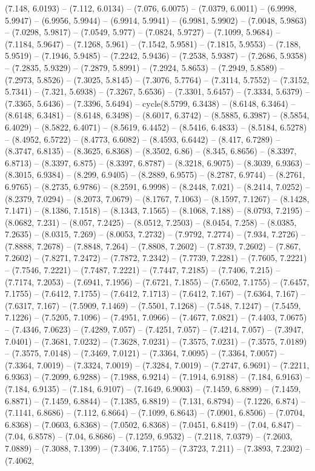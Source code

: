 (7.148, 6.0193) -- (7.112, 6.0134) -- (7.076, 6.0075) -- (7.0379, 6.0011) -- (6.9998, 5.9947) -- (6.9956, 5.9944) -- (6.9914, 5.9941) -- (6.9981, 5.9902) -- (7.0048, 5.9863) -- (7.0298, 5.9817) -- (7.0549, 5.977) -- (7.0824, 5.9727) -- (7.1099, 5.9684) -- (7.1184, 5.9647) -- (7.1268, 5.961) -- (7.1542, 5.9581) -- (7.1815, 5.9553) -- (7.188, 5.9519) -- (7.1946, 5.9485) -- (7.2242, 5.9436) -- (7.2538, 5.9387) -- (7.2686, 5.9358) -- (7.2835, 5.9329) -- (7.2879, 5.8991) -- (7.2924, 5.8653) -- (7.2949, 5.8589) -- (7.2973, 5.8526) -- (7.3025, 5.8145) -- (7.3076, 5.7764) -- (7.3114, 5.7552) -- (7.3152, 5.7341) -- (7.321, 5.6938) -- (7.3267, 5.6536) -- (7.3301, 5.6457) -- (7.3334, 5.6379) -- (7.3365, 5.6436) -- (7.3396, 5.6494) -- cycle(8.5799, 6.3438) -- (8.6148, 6.3464) -- (8.6148, 6.3481) -- (8.6148, 6.3498) -- (8.6017, 6.3742) -- (8.5885, 6.3987) -- (8.5854, 6.4029) -- (8.5822, 6.4071) -- (8.5619, 6.4452) -- (8.5416, 6.4833) -- (8.5184, 6.5278) -- (8.4952, 6.5722) -- (8.4773, 6.6082) -- (8.4593, 6.6442) -- (8.417, 6.7289) -- (8.3747, 6.8135) -- (8.3625, 6.8368) -- (8.3502, 6.86) -- (8.345, 6.8656) -- (8.3397, 6.8713) -- (8.3397, 6.875) -- (8.3397, 6.8787) -- (8.3218, 6.9075) -- (8.3039, 6.9363) -- (8.3015, 6.9384) -- (8.299, 6.9405) -- (8.2889, 6.9575) -- (8.2787, 6.9744) -- (8.2761, 6.9765) -- (8.2735, 6.9786) -- (8.2591, 6.9998) -- (8.2448, 7.021) -- (8.2414, 7.0252) -- (8.2379, 7.0294) -- (8.2073, 7.0679) -- (8.1767, 7.1063) -- (8.1597, 7.1267) -- (8.1428, 7.1471) -- (8.1386, 7.1518) -- (8.1343, 7.1565) -- (8.1068, 7.188) -- (8.0793, 7.2195) -- (8.0682, 7.231) -- (8.057, 7.2425) -- (8.0512, 7.2503) -- (8.0454, 7.258) -- (8.0385, 7.2635) -- (8.0315, 7.269) -- (8.0053, 7.2732) -- (7.9792, 7.2774) -- (7.934, 7.2726) -- (7.8888, 7.2678) -- (7.8848, 7.264) -- (7.8808, 7.2602) -- (7.8739, 7.2602) -- (7.867, 7.2602) -- (7.8271, 7.2472) -- (7.7872, 7.2342) -- (7.7739, 7.2281) -- (7.7605, 7.2221) -- (7.7546, 7.2221) -- (7.7487, 7.2221) -- (7.7447, 7.2185) -- (7.7406, 7.215) -- (7.7174, 7.2053) -- (7.6941, 7.1956) -- (7.6721, 7.1855) -- (7.6502, 7.1755) -- (7.6457, 7.1755) -- (7.6412, 7.1755) -- (7.6412, 7.1713) -- (7.6412, 7.167) -- (7.6364, 7.167) -- (7.6317, 7.167) -- (7.5909, 7.1469) -- (7.5501, 7.1268) -- (7.548, 7.1247) -- (7.5459, 7.1226) -- (7.5205, 7.1096) -- (7.4951, 7.0966) -- (7.4677, 7.0821) -- (7.4403, 7.0675) -- (7.4346, 7.0623) -- (7.4289, 7.057) -- (7.4251, 7.057) -- (7.4214, 7.057) -- (7.3947, 7.0401) -- (7.3681, 7.0232) -- (7.3628, 7.0231) -- (7.3575, 7.0231) -- (7.3575, 7.0189) -- (7.3575, 7.0148) -- (7.3469, 7.0121) -- (7.3364, 7.0095) -- (7.3364, 7.0057) -- (7.3364, 7.0019) -- (7.3324, 7.0019) -- (7.3284, 7.0019) -- (7.2747, 6.9691) -- (7.2211, 6.9363) -- (7.2099, 6.9288) -- (7.1988, 6.9214) -- (7.1914, 6.9188) -- (7.184, 6.9163) -- (7.184, 6.9135) -- (7.184, 6.9107) -- (7.1649, 6.9003) -- (7.1459, 6.8899) -- (7.1459, 6.8871) -- (7.1459, 6.8844) -- (7.1385, 6.8819) -- (7.131, 6.8794) -- (7.1226, 6.874) -- (7.1141, 6.8686) -- (7.112, 6.8664) -- (7.1099, 6.8643) -- (7.0901, 6.8506) -- (7.0704, 6.8368) -- (7.0603, 6.8368) -- (7.0502, 6.8368) -- (7.0451, 6.8419) -- (7.04, 6.847) -- (7.04, 6.8578) -- (7.04, 6.8686) -- (7.1259, 6.9532) -- (7.2118, 7.0379) -- (7.2603, 7.0889) -- (7.3088, 7.1399) -- (7.3406, 7.1755) -- (7.3723, 7.211) -- (7.3893, 7.2302) -- (7.4062, 